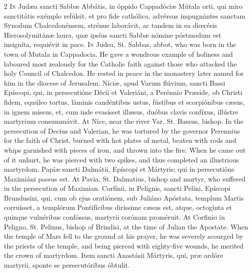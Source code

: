 \begin{paracol}{2}
\lettrine[lines=2]{I}{n} Judæa sancti Sabbæ 
 Abbátis, in óppido Cappadóciæ Mútala orti, qui miro sanctitátis exémplo 
 refúlsit, et pro fide cathólica, advérsus impugnántes sanctam Synodum 
 Chalcedonénsem, strénue laborávit, ac tandem in ea diœcésis Hierosolymitánæ 
 laura, quæ ipsíus sancti Sabbæ nómine póstmodum est insigníta, requiévit in 
 pace.
\switchcolumn
{}
\lettrine[lines=2]{I}{n} Judea, St. Sabbas, abbot, who was 
 born in the town of Mutala in Cappadocia. He gave a wondrous example 
 of holiness and laboured most zealously for the Catholic faith against those 
 who attacked the holy Council of Chalcedon. He rested in peace in the 
 monastery later named for him in the diocese of Jerusalem.
\switchcolumn*
{}
Níciæ, apud Varum 
 flúvium, sancti Bassi Epíscopi, qui, in persecutióne Décii et Valeriáni, a 
 Perénnio Præside, ob Christi fidem, equúleo tortus, láminis candéntibus 
 ustus, fústibus et scorpiónibus cæsus, in ignem missus, et, cum inde 
 evasísset illæsus, duóbus clavis confíxus, illústre martyrium consummávit.
\switchcolumn
{}
At Nice, near the river Var, St. 
 Bassus, bishop. In the persecution of Decius and Valerian, he was 
 tortured by the governor Perennius for the faith of Christ, burned with hot 
 plates of metal, beaten with rods and whips garnished with pieces of iron, 
 and thrown into the fire. When he came out of it unhurt, he was 
 pierced with two spikes, and thus completed an illustrious martyrdom.
\switchcolumn*
{}
Papíæ sancti Dalmátii, 
 Epíscopi et Mártyris; qui in persecutióne Maximiáni passus est.
\switchcolumn
{}
At Pavia, St. Dalmatius, bishop and 
 martyr, who suffered in the persecution of Maximian.
\switchcolumn*
{}
Corfínii, in Pelígnis, 
 sancti Pelíni, Epíscopi Brundusíni, qui, cum ob ejus oratiónem, sub Juliáno Apóstata, templum Martis corruísset, a templórum Pontifícibus diríssime 
 cæsus est, atque, octogínta et quinque vulnéribus confóssus, martyrii 
 corónam proméruit.
\switchcolumn
{}
At Corfinio in Peligno, St. Pelinus, 
 bishop of Brindisi, at the time of Julian the Apostate. When the 
 temple of Mars fell to the ground at his prayer, he was severely scourged by 
 the priests of the temple, and being pierced with eighty-five wounds, he 
 merited the crown of martyrdom.
\switchcolumn*
{}
Item sancti Anastásii 
 Mártyris, qui, præ ardóre martyrii, sponte se persecutóribus óbtulit.

\end{paracol}
